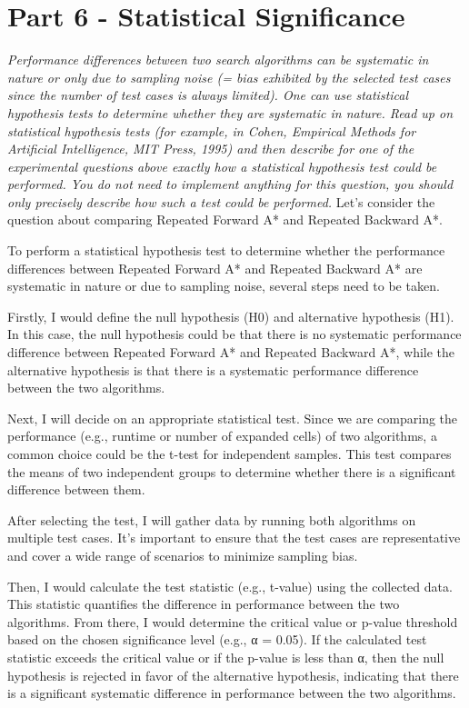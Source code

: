 \graphicspath{{Images/}}

\section{Part 6 - Statistical Significance }

\textit{Performance differences between two search algorithms can be systematic
in nature or only due to sampling noise (= bias exhibited by the selected test cases since the number of test cases is always
limited). One can use statistical hypothesis tests to determine whether they are systematic in nature. Read up on statistical
hypothesis tests (for example, in Cohen, Empirical Methods for Artificial Intelligence, MIT Press, 1995) and then describe
for one of the experimental questions above exactly how a statistical hypothesis test could be performed. You do not need
to implement anything for this question, you should only precisely describe how such a test could be performed.
}
Let's consider the question about comparing Repeated Forward A* and Repeated Backward A*.

To perform a statistical hypothesis test to determine whether the performance differences between Repeated Forward A* and Repeated Backward A* are systematic in nature or due to sampling noise, several steps need to be taken.

Firstly, I would define the null hypothesis (H0) and alternative hypothesis (H1). In this case, the null hypothesis could be that there is no systematic performance difference between Repeated Forward A* and Repeated Backward A*, while the alternative hypothesis is that there is a systematic performance difference between the two algorithms.

Next, I will decide on an appropriate statistical test. Since we are comparing the performance (e.g., runtime or number of expanded cells) of two algorithms, a common choice could be the t-test for independent samples. This test compares the means of two independent groups to determine whether there is a significant difference between them.

After selecting the test, I will gather data by running both algorithms on multiple test cases. It's important to ensure that the test cases are representative and cover a wide range of scenarios to minimize sampling bias.

Then, I would calculate the test statistic (e.g., t-value) using the collected data. This statistic quantifies the difference in performance between the two algorithms. From there, I would determine the critical value or p-value threshold based on the chosen significance level (e.g., α = 0.05). If the calculated test statistic exceeds the critical value or if the p-value is less than α, then the null hypothesis is rejected in favor of the alternative hypothesis, indicating that there is a significant systematic difference in performance between the two algorithms.

